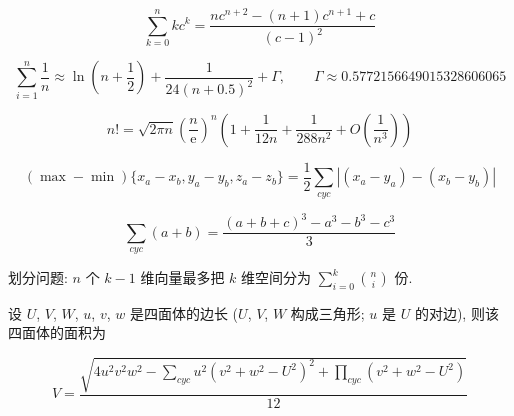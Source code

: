 \begin{equation}
    \sum_{k=0}^nkc^k = \frac{nc^{n+2}-(n+1)c^{n+1}+c}{(c-1)^2}
\end{equation}

\begin{equation}
    \sum_{i=1}^n\frac{1}{n}\approx\ln\left(n + \frac 1 2\right) + \frac{1}{24(n+0.5)^2}+\Gamma,\qquad \Gamma\approx0.5772156649015328606065
\end{equation}

\begin{equation}
    n! = \sqrt{2\pi n}\left(\frac{n}{\mathrm{e}}\right)^n\left(1+\frac{1}{12n}+\frac{1}{288n^2}+O\left(\frac{1}{n^3}\right)\right)
\end{equation}

\begin{equation}
    (\max-\min){\{x_a-x_b, y_a-y_b, z_a-z_b\}} = \frac{1}{2}\sum_{cyc}\left| (x_a-y_a)-(x_b-y_b) \right|
\end{equation}

\begin{equation}
    \sum_{cyc}(a+b) = \frac{(a+b+c)^3 - a^3 - b^3 - c^3}{3}
\end{equation}

划分问题: \(n\) 个 \(k-1\) 维向量最多把 \(k\) 维空间分为 \(\sum_{i=0}^{k}\binom{n}{i}\) 份.

设 \(U\), \(V\), \(W\), \(u\), \(v\), \(w\) 是四面体的边长 (\(U\), \(V\), \(W\) 构成三角形; \(u\) 是 \(U\) 的对边), 则该四面体的面积为

\begin{equation}
    V = \frac{\sqrt{ 4u^2v^2w^2 - \sum_{cyc}{u^2(v^2+w^2-U^2)^2} + \prod_{cyc}{(v^2+w^2-U^2)} }}{12}
\end{equation}
